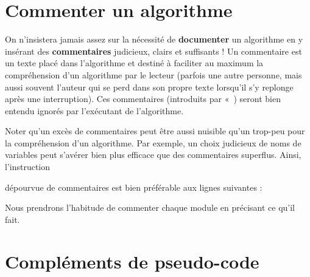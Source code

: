 	\section{Commenter un algorithme}

		On n’insistera jamais assez sur la nécessité de \textbf{documenter} un
		algorithme en y insérant des \textbf{commentaires} judicieux, clairs et
		suffisants ! Un commentaire est un texte placé dans
		l'algorithme et destiné à faciliter au maximum la
		compréhension d’un algorithme par le lecteur (parfois une autre
		personne, mais aussi souvent l'auteur qui se perd dans
		son propre texte lorsqu'il s'y replonge après une
		interruption). Ces commentaires (introduits par
		«~) seront bien entendu ignorés par
		l’exécutant de l’algorithme.


		Noter qu’un excès de commentaires peut être aussi nuisible qu’un
		trop-peu pour la compréhension d’un algorithme. Par exemple, un choix
		judicieux de noms de variables peut s’avérer bien plus efficace que des
		commentaires superflus. Ainsi, l’instruction


		dépourvue de commentaires est bien préférable aux lignes suivantes :

		
		Nous prendrons l'habitude de commenter chaque module en précisant ce qu'il fait.

	\section{Compléments de pseudo-code}

